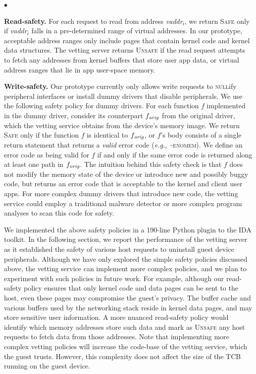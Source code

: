 \documentclass[pageno]{sig-alternate-05-2015}
\newenvironment{mybullet}{\begin{list}{$\bullet$}
{\setlength{\topsep}{1mm}\setlength{\itemsep}{0.5mm}
\setlength{\parsep}{0.5mm}
\setlength{\listparindent}{\parindent} %
\setlength{\itemindent}{0mm}\setlength{\partopsep}{0mm}
\setlength{\labelwidth}{-2mm}
\setlength{\leftmargin}{0mm}}}{\end{list}}
\newcommand{\eg}{\textit{e.g.,}}
\newcommand{\addtext}[2]{#2}
\begin{document}
\begin{mybullet}
%
\item \textsf{\textbf{Read-safety.}} For each request to read from address
\textit{vaddr}$_i$, we return \textsc{Safe} only if \textit{vaddr}$_i$ falls in
a pre-determined range of virtual addresses. In our prototype, acceptable
address ranges only include pages that contain kernel code and kernel data
structures.  The vetting server returns \textsc{Unsafe} if the read request
attempts to fetch any addresses from kernel buffers that store user app data,
or virtual address ranges that lie in app user-space memory.
%
\item \textsf{\textbf{Write-safety.}} Our prototype currently only allows write
requests to \textsc{null}ify peripheral interfaces or install dummy drivers
that disable peripherals. We use the following safety policy for dummy drivers.
For each function $f$ implemented in the dummy driver, consider its counterpart
$f_{\it orig}$ from the original driver, which the vetting service obtains from
the device's memory image. We return \textsc{Safe} only if the function $f$ is
identical to $f_{\it orig}$, or $f$'s body consists of a single return
statement that returns a \textit{valid} error code (\eg~\textsc{-enomem}). We
define an error code as being valid for $f$ if and only if the same error code
is returned along at least one path in $f_{\it orig}$. The intuition behind
this safety check is that $f$ does not modify the memory state of the device or
introduce new and possibly buggy code, but returns an error code that is
acceptable to the kernel and client user apps.  For more complex dummy drivers
that introduce new code, the vetting service could employ a traditional malware
detector or more complex program analyses to scan this code for safety.
%
\end{mybullet}

\addtext{Tasks 3\&12}{We implemented the above safety policies in a 190-line
Python plugin to the IDA toolkit. In the following section, we report the
performance of the vetting server as it established the safety of various host
requests to uninstall guest device peripherals. Although we have only explored
the simple safety policies discussed above, the vetting service can implement
more complex policies, and we plan to experiment with such policies in future
work. For example, although our read-safety policy ensures that only kernel
code and data pages can be sent to the host, even these pages may compromise
the guest's privacy. The buffer cache and various buffers used by the
networking stack reside in kernel data pages, and may store sensitive user
information. A more nuanced read-safety policy would identify which memory
addresses store such data and mark as \textsc{Unsafe} any host requests to
fetch data from those addresses. Note that implementing more complex vetting
policies will increase the code-base of the vetting service, which the guest
trusts. However, this complexity does not affect the size of the TCB running on
the guest device.}
\end{document}

